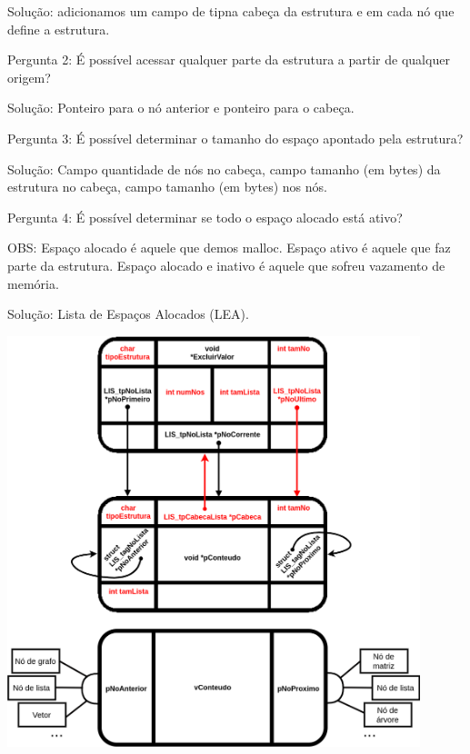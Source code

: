 \documentclass[
	12pt, %
]{fphw}
\begin{document}
\begin{doublespace}
\begin{enumerate}[label=\textbf{\arabic*)}]
              Solução: adicionamos um campo de tipna cabeça da estrutura e em cada nó que define a estrutura.

              Pergunta 2: É possível acessar qualquer parte da estrutura a partir de qualquer origem?

              Solução: Ponteiro para o nó anterior e ponteiro para o cabeça.

              Pergunta 3: É possível determinar o tamanho do espaço apontado pela estrutura?

              Solução: Campo quantidade de nós no cabeça, campo tamanho (em bytes) da estrutura no cabeça, campo tamanho (em bytes) nos nós.

              Pergunta 4: É possível determinar se todo o espaço alocado está ativo?

              OBS: Espaço alocado é aquele que demos malloc. Espaço ativo é aquele que faz parte da estrutura. Espaço alocado e inativo é aquele que sofreu vazamento de memória.

              Solução: Lista de Espaços Alocados (LEA).

              \includegraphics[width=0.9\textwidth]{ModeloFisicoDaListaAutoverificavel.png}

    \end{enumerate}


\end{doublespace}
\end{document}
